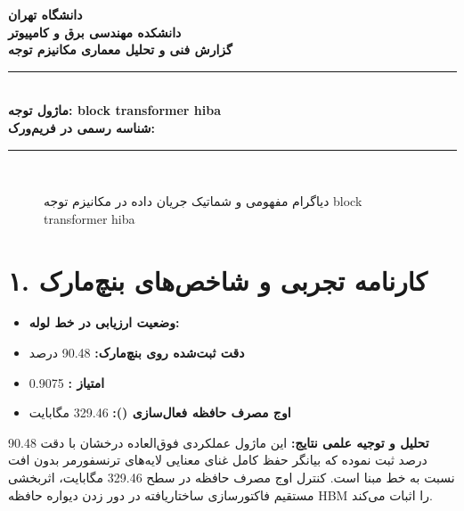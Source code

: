 \documentclass[12pt,a4paper]{article}
\begin{document}
\begin{center}
{\Large\bfseries دانشگاه تهران}\\[0.2cm]
{\large\bfseries دانشکده مهندسی برق و کامپیوتر}\\[0.2cm]
{\large\bfseries گزارش فنی و تحلیل معماری مکانیزم توجه}\\[0.5cm]
\rule{\linewidth}{1pt}\\[0.3cm]
{\LARGE\bfseries ماژول توجه: block transformer hiba}\\[0.2cm]
{\large \textbf{شناسه رسمی در فریم‌ورک:} }\\[0.2cm]
\rule{\linewidth}{1pt}\\[0.5cm]
\end{center}

\begin{figure}[H]
\centering
{}
\caption{دیاگرام مفهومی و شماتیک جریان داده در مکانیزم توجه block transformer hiba}
\end{figure}

\section*{۱. کارنامه تجربی و شاخص‌های بنچ‌مارک}
\begin{itemize}
\item \textbf{وضعیت ارزیابی در خط لوله:} 
\item \textbf{دقت ثبت‌شده روی بنچ‌مارک:} 90.48 درصد
\item \textbf{امتیاز :} 0.9075
\item \textbf{اوج مصرف حافظه فعال‌سازی ():} 329.46 مگابایت
\end{itemize}
\textbf{تحلیل و توجیه علمی نتایج:} این ماژول عملکردی فوق‌العاده درخشان با دقت 90.48 درصد ثبت نموده که بیانگر حفظ کامل غنای معنایی لایه‌های ترنسفورمر بدون افت نسبت به خط مبنا است. کنترل اوج مصرف حافظه در سطح 329.46 مگابایت، اثربخشی مستقیم فاکتورسازی ساختاریافته در دور زدن دیواره حافظه HBM را اثبات می‌کند.
\end{document}
